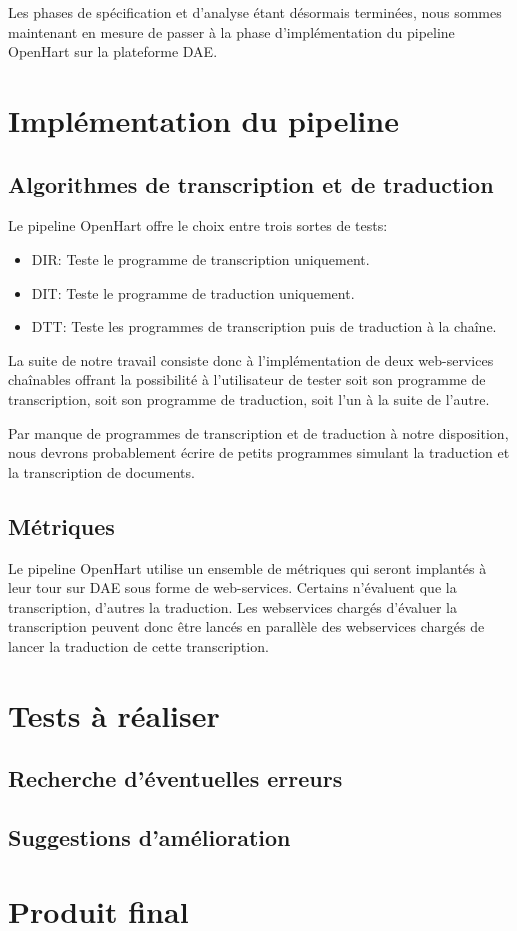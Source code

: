 Les phases de spécification et d'analyse étant désormais terminées, nous sommes maintenant en mesure de passer à la phase d'implémentation du pipeline OpenHart sur la plateforme DAE.

\section{Implémentation du pipeline}
\subsection{Algorithmes de transcription et de traduction}
Le pipeline OpenHart offre le choix entre trois sortes de tests:
\begin{itemize}
    \item DIR: Teste le programme de transcription uniquement.
    \item DIT: Teste le programme de traduction uniquement.
    \item DTT: Teste les programmes de transcription puis de traduction à la chaîne.
\end{itemize}

La suite de notre travail consiste donc à l'implémentation de deux web-services chaînables offrant la possibilité à l'utilisateur de tester soit son programme de transcription, soit son programme de traduction, soit l'un à la suite de l'autre. 

Par manque de programmes de transcription et de traduction à notre disposition, nous devrons probablement écrire de petits programmes simulant la traduction et la transcription de documents. 


\subsection{Métriques}

Le pipeline OpenHart utilise un ensemble de métriques qui seront implantés à leur tour sur DAE sous forme de web-services. Certains n'évaluent que la transcription, d'autres la traduction. Les webservices chargés d'évaluer la transcription peuvent donc être lancés en parallèle des webservices chargés de lancer la traduction de cette transcription.
\section{Tests à réaliser}
\subsection{Recherche d'éventuelles erreurs}
\subsection{Suggestions d'amélioration}
\section{Produit final}
